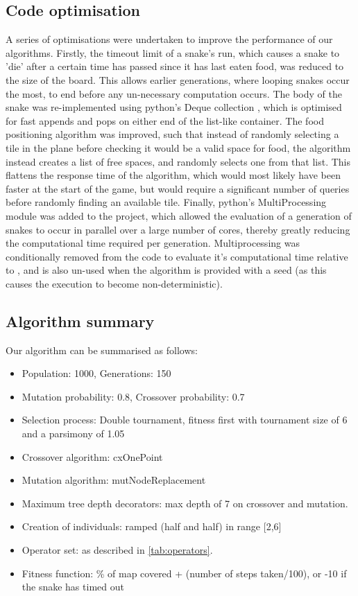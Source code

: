 \documentclass[british,10pt,a4paper]{article}
\begin{document}
\subsection{Code optimisation}
\label{subsec:code_optimisation}
A series of optimisations were undertaken to improve the performance of our algorithms. Firstly, the timeout limit of a snake's run, which causes a snake to 'die' after a certain time has passed since it has last eaten food, was reduced to the size of the board. This allows earlier generations, where looping snakes occur the most, to end before any un-necessary computation occurs. \newline
The body of the snake was re-implemented using python's Deque collection \cite{noauthor_undated-bi}, which is optimised for fast appends and pops on either end of the list-like container. The food positioning algorithm was improved, such that instead of randomly selecting a tile in the plane before checking it would be a valid space for food, the algorithm instead creates a list of free spaces, and randomly selects one from that list. This flattens the response time of the algorithm, which would most likely have been faster at the start of the game, but would require a significant number of queries before randomly finding an available tile. Finally, python's MultiProcessing module was added to the project, which allowed the evaluation of a generation of snakes to occur in parallel over a large number of cores, thereby greatly reducing the computational time required per generation. Multiprocessing was conditionally removed from the code to evaluate it's computational time relative to \citet{Ehlis2000-sz}, and is also un-used when the algorithm is provided with a seed (as this causes the execution to become non-deterministic).

\subsection{Algorithm summary}
Our algorithm can be summarised as follows:
\begin{itemize}
	\item Population: 1000, Generations: 150
	\item Mutation probability: 0.8, Crossover probability: 0.7
	\item Selection process: Double tournament, fitness first with tournament size of 6 and a parsimony of 1.05
	\item Crossover algorithm: cxOnePoint
	\item Mutation algorithm: mutNodeReplacement
	\item Maximum tree depth decorators: max depth of 7 on crossover and mutation.
	\item Creation of individuals: ramped (half and half) in range [2,6]
	\item Operator set: as described in \autoref{tab:operators}.
	\item Fitness function: \% of map covered + (number of steps taken/100), or -10 if the snake has timed out

\end{itemize}
\end{document}
